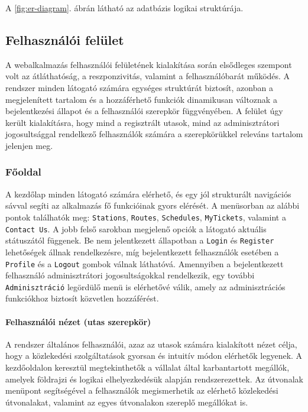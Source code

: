 A \ref{fig:er-diagram}. ábrán látható az adatbázis logikai struktúrája.


\subsection{Felhasználói felület}

\indent A webalkalmazás felhasználói felületének kialakítása során elsődleges szempont volt az átláthatóság, a reszponzivitás, valamint a felhasználóbarát működés. A rendszer minden látogató számára egységes struktúrát biztosít, azonban a megjelenített tartalom és a hozzáférhető funkciók dinamikusan változnak a bejelentkezési állapot és a felhasználói szerepkör függvényében. A felület úgy került kialakításra, hogy mind a regisztrált utasok, mind az adminisztrátori jogosultsággal rendelkező felhasználók számára a szerepkörükkel releváns tartalom jelenjen meg.

\subsubsection{Főoldal}

\indent A kezdőlap minden látogató számára elérhető, és egy jól strukturált navigációs sávval segíti az alkalmazás fő funkcióinak gyors elérését. A menüsorban az alábbi pontok találhatók meg: \texttt{Stations}, \texttt{Routes}, \texttt{Schedules}, \texttt{MyTickets}, valamint a \texttt{Contact Us}. A jobb felső sarokban megjelenő opciók a látogató aktuális státuszától függenek. Be nem jelentkezett állapotban a \texttt{Login} és \texttt{Register} lehetőségek állnak rendelkezésre, míg bejelentkezett felhasználók esetében a \texttt{Profile} és a \texttt{Logout} gombok válnak láthatóvá. Amennyiben a bejelentkezett felhasználó adminisztrátori jogosultságokkal rendelkezik, egy további \texttt{Adminisztráció} legördülő menü is elérhetővé válik, amely az adminisztrációs funkciókhoz biztosít közvetlen hozzáférést.

\paragraph{Felhasználói nézet (utas szerepkör)}

\indent A rendszer általános felhasználói, azaz az utasok számára kialakított nézet célja, hogy a közlekedési szolgáltatások gyorsan és intuitív módon elérhetők legyenek. A kezdőoldalon keresztül megtekinthetők a vállalat által karbantartott megállók, amelyek földrajzi és logikai elhelyezkedésük alapján rendszerezettek. Az útvonalak menüpont segítségével a felhasználók megismerhetik az elérhető közlekedési útvonalakat, valamint az egyes útvonalakon szereplő megállókat is.

